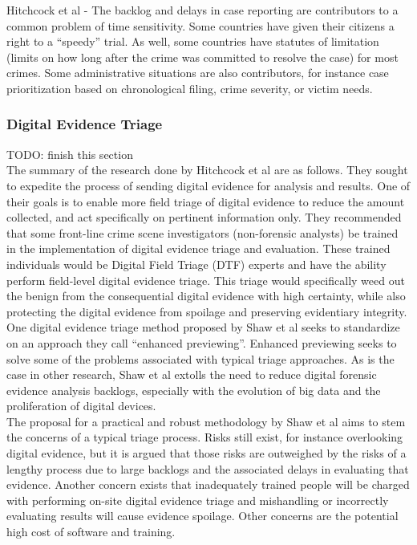 \documentclass[12pt]{article}
\begin{document}
Hitchcock et al\cite{hitchcock2016tiered} - The backlog and delays in case reporting are contributors to a common problem of time sensitivity.  Some countries 
have given their citizens a right to a ``speedy'' trial.  As well, some countries have statutes of limitation (limits
on how long after the crime was committed to resolve the case) for most crimes.  Some administrative situations are
also contributors, for instance case prioritization based on chronological filing, crime severity, or victim needs.\\

\subsubsection{Digital Evidence Triage}
TODO: finish this section\\
The summary of the research done by Hitchcock et al\cite{hitchcock2016tiered} are as follows.  They sought to expedite
the process of sending digital evidence for analysis and results.  One of their goals is to enable more field triage
of digital evidence to reduce the amount collected, and act specifically on pertinent information only.  They 
recommended that some front-line crime scene investigators (non-forensic analysts) be trained in the implementation
of digital evidence triage and evaluation.  These trained individuals would be Digital Field Triage (DTF) experts and
have the ability perform field-level digital evidence triage.  This triage would specifically weed out the benign
from the consequential digital evidence with high certainty, while also protecting the digital evidence from spoilage
and preserving evidentiary integrity.\\

One digital evidence triage method proposed by Shaw et al\cite{shaw2013practical} seeks to standardize on an 
approach they call ``enhanced previewing''.  Enhanced previewing seeks to solve some of the problems associated with
typical triage approaches.  As is the case in other research, Shaw et al\cite{shaw2013practical} extolls the 
need to reduce digital forensic evidence analysis backlogs, especially with the evolution of big data and the
proliferation of digital devices.\\

The proposal for a practical and robust methodology by Shaw et al\cite{shaw2013practical} aims to stem the concerns
of a typical triage process.  Risks still exist, for instance overlooking digital evidence, but it is argued that
those risks are outweighed by the risks of a lengthy process due to large backlogs and the associated delays in
evaluating that evidence.  Another concern exists that inadequately trained people will be charged with performing
on-site digital evidence triage and mishandling or incorrectly evaluating results will cause evidence spoilage.
Other concerns are the potential high cost of software and training.\\
\end{document}
